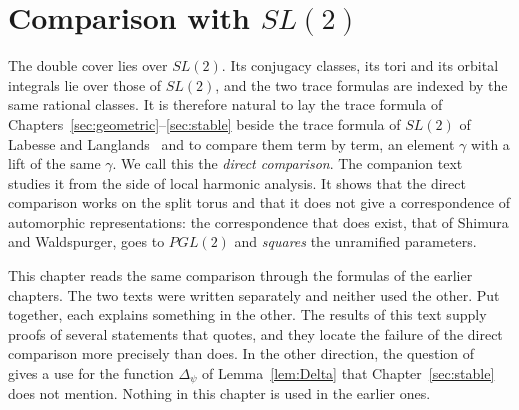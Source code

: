 \providecommand{\GA}{\overline{G(\A)}}
\providecommand{\Gb}{\overline{SL(2,F)}}

\chapter{Comparison with \texorpdfstring{$SL(2)$}{SL(2)}}\label{sec:compare}

The double cover lies over $SL(2)$. Its conjugacy classes, its tori and
its orbital integrals lie over those of $SL(2)$, and the two trace
formulas are indexed by the same rational classes. It is therefore
natural to lay the trace formula of
Chapters~\ref{sec:geometric}--\ref{sec:stable} beside the trace formula
of $SL(2)$ of Labesse and Langlands~\cite{LL79} and to compare them term
by term, an element $\gamma$ with a lift of the same $\gamma$. We call
this the \emph{direct comparison}. The companion text~\cite{JC26} studies
it from the side of local harmonic analysis. It shows that the direct
comparison works on the split torus and that it does not give a
correspondence of automorphic representations: the correspondence that
does exist, that of Shimura and Waldspurger, goes to $PGL(2)$ and
\emph{squares} the unramified parameters.

This chapter reads the same comparison through the formulas of the
earlier chapters. The two texts were written separately and neither used
the other. Put together, each explains something in the other. The
results of this text supply proofs of several statements that
\cite{JC26} quotes, and they locate the failure of the direct comparison
more precisely than \cite{JC26} does. In the other direction, the
question of~\cite{JC26} gives a use for the function $\Delta_\psi$ of
Lemma~\ref{lem:Delta} that Chapter~\ref{sec:stable} does not mention. Nothing in this
chapter is used in the earlier ones.

